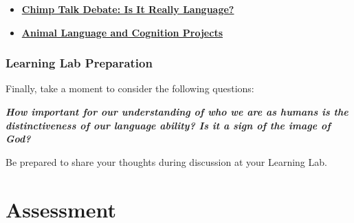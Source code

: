 \documentclass[
]{book}
\begin{document}
\begin{itemize}
\item
  \href{http://tuvalu.santafe.edu/~johnson/articles.chimp.html}{\textbf{Chimp Talk Debate: Is It Really Language?}}
\item
  \href{https://www.massey.ac.nz/~alock/hbook/ristau.htm}{\textbf{Animal Language and Cognition Projects}}
\end{itemize}

\hypertarget{learning-lab-preparation-3}{%
\subsubsection*{Learning Lab Preparation}\label{learning-lab-preparation-3}}

\begin{reflect}
Finally, take a moment to consider the following questions:

\textbf{\emph{How important for our understanding of who we are as humans is the distinctiveness of our language ability? Is it a sign of the image of God?}}

Be prepared to share your thoughts during discussion at your Learning Lab.
\end{reflect}

\hypertarget{assessment}{%
\section*{Assessment}\label{assessment}}
\end{document}
